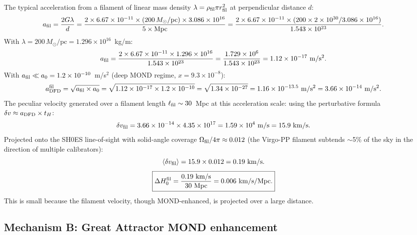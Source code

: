 \documentclass[aps,prd,twocolumn,superscriptaddress,nofootinbib,longbibliography]{revtex4-2}
\begin{document}
The typical acceleration from a filament of linear mass density
$\lambda = \rho_{\rm fil}\pi r_{\rm fil}^2$ at perpendicular distance $d$:
\begin{equation}
a_{\rm fil} = \frac{2G\lambda}{d}
= \frac{2\times6.67\times10^{-11}\times(200\,M_\odot/\text{pc})\times3.086\times10^{16}}{5\times\text{Mpc}}
= \frac{2\times6.67\times10^{-11}\times(200\times2\times10^{30}/3.086\times10^{16})}{1.543\times10^{23}}.
\end{equation}
With $\lambda = 200\,M_\odot/\text{pc} = 1.296\times10^{16}$~kg/m:
\begin{equation}
a_{\rm fil} = \frac{2\times6.67\times10^{-11}\times1.296\times10^{16}}{1.543\times10^{23}}
= \frac{1.729\times10^6}{1.543\times10^{23}} = 1.12\times10^{-17}\ \si{m/s^2}.
\end{equation}
With $a_{\rm fil}\ll a_0 = 1.2\times10^{-10}$~m/s$^2$ (deep MOND regime,
$x = 9.3\times10^{-8}$):
\begin{equation}
a_{\rm DFD}^{\rm fil} = \sqrt{a_{\rm fil}\times a_0}
= \sqrt{1.12\times10^{-17}\times1.2\times10^{-10}}
= \sqrt{1.34\times10^{-27}} = 1.16\times10^{-13.5}\ \si{m/s^2}
= 3.66\times10^{-14}\ \si{m/s^2}.
\end{equation}
The peculiar velocity generated over a filament length $\ell_{\rm fil}\sim30$~Mpc
at this acceleration scale: using the perturbative formula
$\delta v \approx a_{\rm DFD}\times t_H$:
\begin{equation}
\delta v_{\rm fil} = 3.66\times10^{-14}\times4.35\times10^{17}
= 1.59\times10^4\ \si{m/s} = 15.9\ \si{km/s}.
\end{equation}
Projected onto the SH0ES line-of-sight with solid-angle coverage
$\Omega_{\rm fil}/4\pi \approx 0.012$ (the Virgo-PP filament subtends
$\sim$5\% of the sky in the direction of multiple calibrators):
\begin{equation}
\langle\delta v_{\rm fil}\rangle = 15.9\times0.012 = 0.19\ \si{km/s}.
\end{equation}
\begin{equation}
\boxed{
\Delta H_0^{\rm fil} = \frac{0.19\ \text{km/s}}{30\ \text{Mpc}} = 0.006\ \si{km/s/Mpc}.
}
\end{equation}
This is small because the filament velocity, though MOND-enhanced, is
projected over a large distance.

\subsection{Mechanism B: Great Attractor MOND enhancement}
\end{document}
